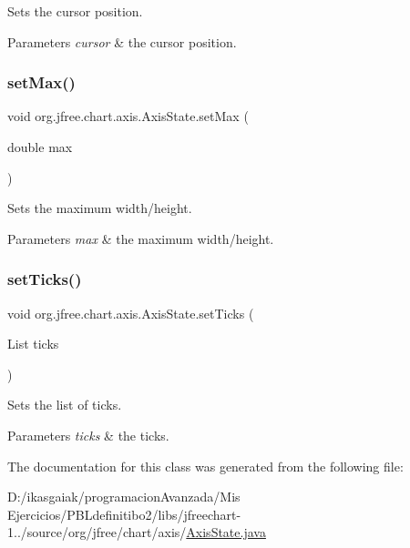 Sets the cursor position.


\begin{DoxyParams}{Parameters}
{\em cursor} & the cursor position. \\
\hline
\end{DoxyParams}
\mbox{\label{classorg_1_1jfree_1_1chart_1_1axis_1_1_axis_state_a700c56fd13000708b5d80eb595634235}} 
\subsubsection{\texorpdfstring{set\+Max()}{setMax()}}
{\footnotesize\ttfamily void org.\+jfree.\+chart.\+axis.\+Axis\+State.\+set\+Max (\begin{DoxyParamCaption}\item[{double}]{max }\end{DoxyParamCaption})}

Sets the maximum width/height.


\begin{DoxyParams}{Parameters}
{\em max} & the maximum width/height. \\
\hline
\end{DoxyParams}
\mbox{\label{classorg_1_1jfree_1_1chart_1_1axis_1_1_axis_state_a54715140c40902a1e95a29f186752d60}} 
\subsubsection{\texorpdfstring{set\+Ticks()}{setTicks()}}
{\footnotesize\ttfamily void org.\+jfree.\+chart.\+axis.\+Axis\+State.\+set\+Ticks (\begin{DoxyParamCaption}\item[{List}]{ticks }\end{DoxyParamCaption})}

Sets the list of ticks.


\begin{DoxyParams}{Parameters}
{\em ticks} & the ticks. \\
\hline
\end{DoxyParams}


The documentation for this class was generated from the following file\+:\begin{DoxyCompactItemize}
\item 
D\+:/ikasgaiak/programacion\+Avanzada/\+Mis Ejercicios/\+P\+B\+Ldefinitibo2/libs/jfreechart-\/1../source/org/jfree/chart/axis/\mbox{\hyperlink{_axis_state_8java}{Axis\+State.\+java}}\end{DoxyCompactItemize}
